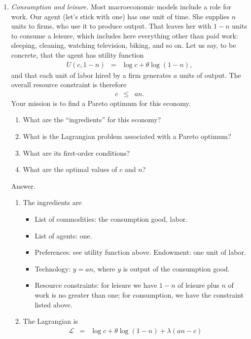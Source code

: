 \documentclass[11pt]{article}
\begin{document}
\begin{enumerate}
\item {\it Consumption and leisure.\/}
Most macroeconomic models include a role for work.
Our agent (let's stick with one) has one unit of time.
She supplies $n$ units to firms, who use it to produce output.
That leaves her with $1-n$ units to consume a leisure,
which includes here everything other than paid work:
sleeping, cleaning, watching television, biking, and so on.
Let us say, to be concrete, that the agent has utility function
\begin{eqnarray*}
    U(c,1-n) &=& \log c + \theta \log (1-n) ,
\end{eqnarray*}
and that each unit of labor hired by a firm generates $a$ units of output.
The overall resource constraint is therefore
\begin{eqnarray*}
        c &\leq& a n .
\end{eqnarray*}
Your mission is to find a Pareto optimum for this economy.
\begin{enumerate}
\item What are the ``ingredients'' for this economy?
\item What is the Lagrangian problem associated with a Pareto optimum?
\item What are its first-order conditions?
\item What are the optimal values of $c$ and $n$?
\end{enumerate}
%
Answer.
\begin{enumerate}
\item The ingredients are
\begin{itemize}
\item List of commodities:  the consumption good, labor.
\item List of agents:  one.
\item Preferences:  see utility function above.
Endowment:  one unit of labor.
\item Technology:  $y = an$, where $y$ is output of the consumption good.
\item Resource constraints:  for leisure we have $1-n$ of leisure plus $n$ of work
is no greater than one; for consumption, we have the constraint listed above.
\end{itemize}
\item The Lagrangian is
\begin{eqnarray*}
    \mathcal{L} &=& \log c + \theta \log (1-n) + \lambda (an - c)
\end{eqnarray*}

\end{enumerate}
\end{enumerate}
\end{document}
